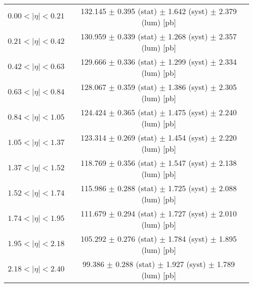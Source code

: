 \begin{tabular}{lc}
\hline
$0.00 < |\eta| <0.21$          & 132.145 $\pm$ 0.395 (stat) $\pm$ 1.642 (syst) $\pm$ 2.379 (lum) [pb]  \\
$0.21 < |\eta| <0.42$          & 130.959 $\pm$ 0.339 (stat) $\pm$ 1.268 (syst) $\pm$ 2.357 (lum) [pb]  \\
$0.42 < |\eta| <0.63$          & 129.666 $\pm$ 0.336 (stat) $\pm$ 1.299 (syst) $\pm$ 2.334 (lum) [pb]  \\
$0.63 < |\eta| <0.84$          & 128.067 $\pm$ 0.359 (stat) $\pm$ 1.386 (syst) $\pm$ 2.305 (lum) [pb]  \\
$0.84 < |\eta| <1.05$          & 124.424 $\pm$ 0.365 (stat) $\pm$ 1.475 (syst) $\pm$ 2.240 (lum) [pb]  \\
$1.05 < |\eta| <1.37$          & 123.314 $\pm$ 0.269 (stat) $\pm$ 1.454 (syst) $\pm$ 2.220 (lum) [pb]  \\
$1.37 < |\eta| <1.52$          & 118.769 $\pm$ 0.356 (stat) $\pm$ 1.547 (syst) $\pm$ 2.138 (lum) [pb]  \\
$1.52 < |\eta| <1.74$          & 115.986 $\pm$ 0.288 (stat) $\pm$ 1.725 (syst) $\pm$ 2.088 (lum) [pb]  \\
$1.74 < |\eta| <1.95$          & 111.679 $\pm$ 0.294 (stat) $\pm$ 1.727 (syst) $\pm$ 2.010 (lum) [pb]  \\
$1.95 < |\eta| <2.18$          & 105.292 $\pm$ 0.276 (stat) $\pm$ 1.784 (syst) $\pm$ 1.895 (lum) [pb]  \\
$2.18 < |\eta| <2.40$          & 99.386 $\pm$ 0.288 (stat) $\pm$ 1.927 (syst) $\pm$ 1.789 (lum) [pb]  \\
\hline
\end{tabular}
